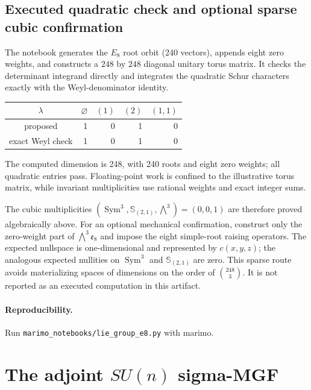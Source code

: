 \documentclass[10pt]{article}
\newcommand{\CT}{\operatorname{CT}}
\newcommand{\SMG}{\operatorname{SMG}}
\begin{document}
\subsection{Executed quadratic check and optional sparse cubic confirmation}
The notebook generates the $E_8$ root orbit (240 vectors), appends eight zero
weights, and constructs a $248$ by $248$ diagonal unitary torus matrix.  It
checks the determinant integrand directly and integrates the quadratic Schur
characters exactly with the Weyl-denominator identity.
\begin{center}\small
\begin{tabular}{@{}c|rrrr@{}}\toprule
$\lambda$&$\varnothing$&$(1)$&$(2)$&$(1,1)$\\\midrule
proposed&1&0&1&0\\
exact Weyl check&1&0&1&0\\\bottomrule
\end{tabular}
\end{center}
The computed dimension is 248, with 240 roots and eight zero weights; all
quadratic entries pass.  Floating-point work is confined to the illustrative
torus matrix, while invariant multiplicities use rational weights and exact
integer sums.

The cubic multiplicities
$(\operatorname{Sym}^3,\mathbb S_{(2,1)},\bigwedge^3)=(0,0,1)$ are therefore
proved algebraically above.  For an optional mechanical confirmation,
construct only the zero-weight part of
$\bigwedge^3\mathfrak e_8$ and impose the eight simple-root raising operators.
The expected nullspace is one-dimensional and represented by $c(x,y,z)$; the
analogous expected nullities on $\operatorname{Sym}^3$ and
$\mathbb S_{(2,1)}$ are zero.  This sparse route avoids materializing spaces
of dimensions on the order of $\binom{248}{3}$.  It is not reported as an
executed computation in this artifact.

\paragraph{Reproducibility.} Run \texttt{marimo\_notebooks/lie\_group\_e8.py} with marimo.
\endgroup


\clearpage
\section[The adjoint SU(n) sigma-MGF]{The adjoint $SU(n)$ sigma-MGF}\label{proof:su-adjoint}
\begingroup
{}
\providecommand{\Sg}{\SMG}
\renewcommand{\Sg}{\SMG}
\providecommand{\CT}{\operatorname{CT}}
\renewcommand{\CT}{\operatorname{CT}}
\setcounter{theorem}{0}
\setcounter{proposition}{0}
\setcounter{lemma}{0}
\setcounter{corollary}{0}
\setcounter{remark}{0}
\begin{abstract}
We derive the compact Molien--Weyl formula for the adjoint representation of
$SU(n)$ and test the manageable cases $n=2,3,4$.  Exact Schur-character
integration confirms the quadratic Killing form, the alternating bracket
tensor, and the symmetric cubic precisely when $n\ge3$.
\end{abstract}
\end{document}
